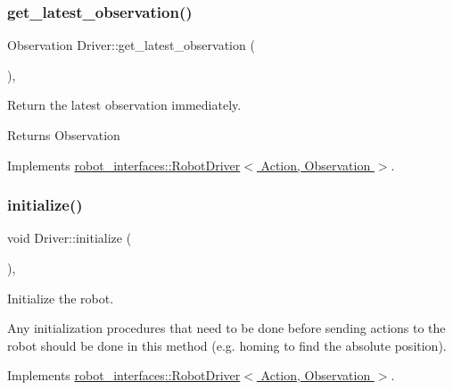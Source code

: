 \subsubsection{\texorpdfstring{get\+\_\+latest\+\_\+observation()}{get\_latest\_observation()}}
{\footnotesize\ttfamily Observation Driver\+::get\+\_\+latest\+\_\+observation (\begin{DoxyParamCaption}{ }\end{DoxyParamCaption})\hspace{0.3cm}{\ttfamily [inline]}, {\ttfamily [virtual]}}



Return the latest observation immediately. 

\begin{DoxyReturn}{Returns}
Observation 
\end{DoxyReturn}


Implements \hyperlink{classrobot__interfaces_1_1RobotDriver_ad13d4f4fdfe78bdde4fc964f07fa45e2}{robot\+\_\+interfaces\+::\+Robot\+Driver$<$ Action, Observation $>$}.

\mbox{\label{classDriver_a81c0beb523fad80cd40cfcc6a6e3de2d}} 
\subsubsection{\texorpdfstring{initialize()}{initialize()}}
{\footnotesize\ttfamily void Driver\+::initialize (\begin{DoxyParamCaption}{ }\end{DoxyParamCaption})\hspace{0.3cm}{\ttfamily [inline]}, {\ttfamily [virtual]}}



Initialize the robot. 

Any initialization procedures that need to be done before sending actions to the robot should be done in this method (e.\+g. homing to find the absolute position). 

Implements \hyperlink{classrobot__interfaces_1_1RobotDriver_af3cbef570a455e1f8085d701282264ff}{robot\+\_\+interfaces\+::\+Robot\+Driver$<$ Action, Observation $>$}.

\mbox{\label{classDriver_a630fc9183eb419beb09b5828b4547b6d}} 
